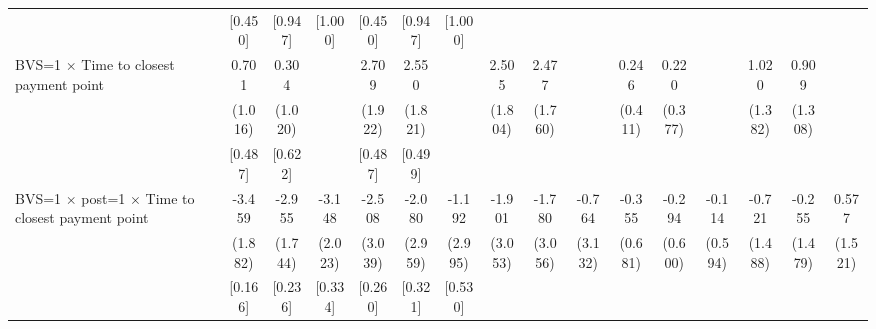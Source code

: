 {\begin{tabular}{l*{15}{c}}
                    &     [0.450]         &     [0.947]         &     [1.000]         &     [0.450]         &     [0.947]         &     [1.000]         &                     &                     &                     &                     &                     &                     &                     &                     &                     \\
BVS=1 $\times$ Time to closest payment point&       0.701         &       0.304         &                     &       2.709         &       2.550         &                     &       2.505         &       2.477         &                     &       0.246         &       0.220         &                     &       1.020         &       0.909         &                     \\
                    &     (1.016)         &     (1.020)         &                     &     (1.922)         &     (1.821)         &                     &     (1.804)         &     (1.760)         &                     &     (0.411)         &     (0.377)         &                     &     (1.382)         &     (1.308)         &                     \\
                    &     [0.487]         &     [0.622]         &                     &     [0.487]         &     [0.499]         &                     &                     &                     &                     &                     &                     &                     &                     &                     &                     \\
BVS=1 $\times$ post=1 $\times$ Time to closest payment point&      -3.459\sym{*}  &      -2.955\sym{*}  &      -3.148         &      -2.508         &      -2.080         &      -1.192         &      -1.901         &      -1.780         &      -0.764         &      -0.355         &      -0.294         &      -0.114         &      -0.721         &      -0.255         &       0.577         \\
                    &     (1.882)         &     (1.744)         &     (2.023)         &     (3.039)         &     (2.959)         &     (2.995)         &     (3.053)         &     (3.056)         &     (3.132)         &     (0.681)         &     (0.600)         &     (0.594)         &     (1.488)         &     (1.479)         &     (1.521)         \\
                    &     [0.166]         &     [0.236]         &     [0.334]         &     [0.260]         &     [0.321]         &     [0.530]         &                     &                     &                     &                     &                     &                     &                     &                     &                     \\

\end{tabular}}
